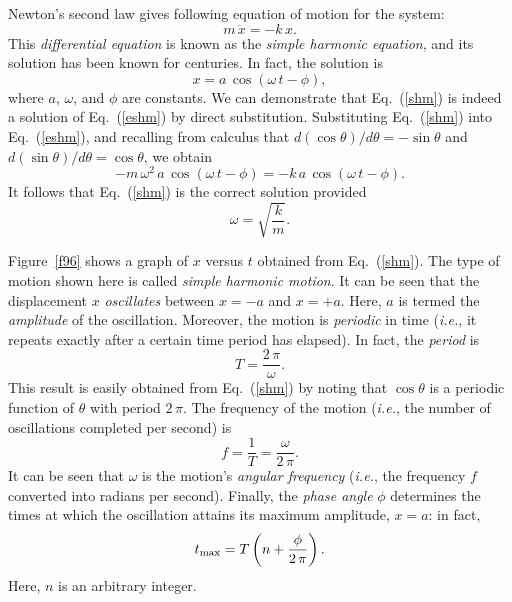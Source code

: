 Newton's second law gives following equation of motion for the system:
\begin{equation}
m\,\ddot{x} = - k\,x.\label{eshm}
\end{equation}
This {\em differential equation} is known as the {\em simple harmonic equation}, and its solution has been known
for centuries. In fact, the solution is
\begin{equation}
x = a\,\cos(\omega\,t-\phi),\label{shm}
\end{equation}
where $a$, $\omega$, and $\phi$ are constants. We can demonstrate that Eq.~(\ref{shm}) is indeed a
solution of Eq.~(\ref{eshm}) by direct substitution. Substituting  Eq.~(\ref{shm}) into
Eq.~(\ref{eshm}), and recalling from calculus that $d(\cos\theta)/d\theta = -\sin\theta$ and
$d (\sin\theta)/d\theta = \cos\theta$, we obtain
\begin{equation}
-m\,\omega^2\,a\,\cos(\omega\,t-\phi) =- k\,a\,\cos(\omega\,t-\phi).
\end{equation}
It follows that Eq.~(\ref{shm}) is the correct solution provided
\begin{equation}\label{eomega}
\omega = \sqrt{\frac{k}{m}}.
\end{equation}

Figure~\ref{f96} shows a graph of $x$ versus $t$ obtained from Eq.~(\ref{shm}). The type of motion shown here is
called {\em simple harmonic motion}.
It can be seen that
the displacement $x$ {\em oscillates} between $x=-a$ and $x=+a$. Here, $a$ is termed the {\em amplitude}
of the oscillation. Moreover, the motion is {\em periodic} in time ({\em i.e.}, it repeats exactly after
a certain time period has elapsed). In fact, the {\em period} is
\begin{equation}
T = \frac{2\,\pi}{\omega}.
\end{equation}
This result is easily obtained from Eq.~(\ref{shm}) by noting that $\cos\theta$ is a periodic function 
of $\theta$ with
period $2\,\pi$. The frequency of the motion ({\em i.e.}, the number of oscillations completed per
second) is
\begin{equation}
f = \frac{1}{T} = \frac{\omega}{2\,\pi}.
\end{equation}
It can be seen that $\omega$ is the motion's {\em angular frequency}  ({\em i.e.}, the frequency
$f$ converted into radians per second).
Finally, the {\em phase angle} $\phi$ determines the times at which the oscillation attains its maximum amplitude,
$x=a$: in fact,
\begin{equation}
t_{\rm max} = T \left(n + \frac{\phi}{2\,\pi}\right).
\end{equation}
Here, $n$ is an arbitrary integer. 

